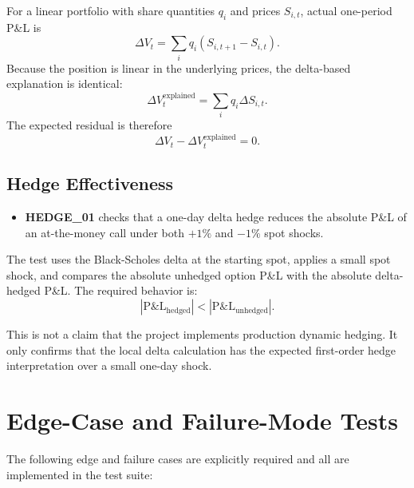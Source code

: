 \documentclass[11pt]{article}
\begin{document}
For a linear portfolio with share quantities $q_i$ and prices $S_{i,t}$,
actual one-period P\&L is
\[
  \Delta V_t
  =
  \sum_i q_i (S_{i,t+1} - S_{i,t}).
\]
Because the position is linear in the underlying prices, the delta-based
explanation is identical:
\[
  \Delta V_t^{\mathrm{explained}}
  =
  \sum_i q_i \Delta S_{i,t}.
\]
The expected residual is therefore
\[
  \Delta V_t - \Delta V_t^{\mathrm{explained}} = 0.
\]

\subsection{Hedge Effectiveness}

\begin{itemize}
  \item \textbf{HEDGE\_01} checks that a one-day delta hedge reduces the
    absolute P\&L of an at-the-money call under both $+1\%$ and $-1\%$
    spot shocks.
\end{itemize}

The test uses the Black-Scholes delta at the starting spot, applies a
small spot shock, and compares the absolute unhedged option P\&L with
the absolute delta-hedged P\&L.  The required behavior is:
\[
  |\mathrm{P\&L}_{\mathrm{hedged}}|
  <
  |\mathrm{P\&L}_{\mathrm{unhedged}}|.
\]

This is not a claim that the project implements production dynamic
hedging.  It only confirms that the local delta calculation has the
expected first-order hedge interpretation over a small one-day shock.

\section{Edge-Case and Failure-Mode Tests}

The following edge and failure cases are explicitly required and all
are implemented in the test suite:
\end{document}
